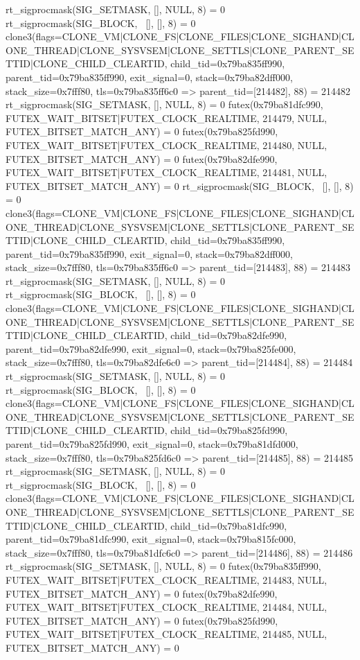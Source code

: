 \begin{breakableverbatim}
rt_sigprocmask(SIG_SETMASK, [], NULL, 8) = 0
rt_sigprocmask(SIG_BLOCK, ~[], [], 8)   = 0
clone3({flags=CLONE_VM|CLONE_FS|CLONE_FILES|CLONE_SIGHAND|CLONE_THREAD|CLONE_SYSVSEM|CLONE_SETTLS|CLONE_PARENT_SETTID|CLONE_CHILD_CLEARTID, child_tid=0x79ba835ff990, parent_tid=0x79ba835ff990, exit_signal=0, stack=0x79ba82dff000, stack_size=0x7fff80, tls=0x79ba835ff6c0} => {parent_tid=[214482]}, 88) = 214482
rt_sigprocmask(SIG_SETMASK, [], NULL, 8) = 0
futex(0x79ba81dfc990, FUTEX_WAIT_BITSET|FUTEX_CLOCK_REALTIME, 214479, NULL, FUTEX_BITSET_MATCH_ANY) = 0
futex(0x79ba825fd990, FUTEX_WAIT_BITSET|FUTEX_CLOCK_REALTIME, 214480, NULL, FUTEX_BITSET_MATCH_ANY) = 0
futex(0x79ba82dfe990, FUTEX_WAIT_BITSET|FUTEX_CLOCK_REALTIME, 214481, NULL, FUTEX_BITSET_MATCH_ANY) = 0
rt_sigprocmask(SIG_BLOCK, ~[], [], 8)   = 0
clone3({flags=CLONE_VM|CLONE_FS|CLONE_FILES|CLONE_SIGHAND|CLONE_THREAD|CLONE_SYSVSEM|CLONE_SETTLS|CLONE_PARENT_SETTID|CLONE_CHILD_CLEARTID, child_tid=0x79ba835ff990, parent_tid=0x79ba835ff990, exit_signal=0, stack=0x79ba82dff000, stack_size=0x7fff80, tls=0x79ba835ff6c0} => {parent_tid=[214483]}, 88) = 214483
rt_sigprocmask(SIG_SETMASK, [], NULL, 8) = 0
rt_sigprocmask(SIG_BLOCK, ~[], [], 8)   = 0
clone3({flags=CLONE_VM|CLONE_FS|CLONE_FILES|CLONE_SIGHAND|CLONE_THREAD|CLONE_SYSVSEM|CLONE_SETTLS|CLONE_PARENT_SETTID|CLONE_CHILD_CLEARTID, child_tid=0x79ba82dfe990, parent_tid=0x79ba82dfe990, exit_signal=0, stack=0x79ba825fe000, stack_size=0x7fff80, tls=0x79ba82dfe6c0} => {parent_tid=[214484]}, 88) = 214484
rt_sigprocmask(SIG_SETMASK, [], NULL, 8) = 0
rt_sigprocmask(SIG_BLOCK, ~[], [], 8)   = 0
clone3({flags=CLONE_VM|CLONE_FS|CLONE_FILES|CLONE_SIGHAND|CLONE_THREAD|CLONE_SYSVSEM|CLONE_SETTLS|CLONE_PARENT_SETTID|CLONE_CHILD_CLEARTID, child_tid=0x79ba825fd990, parent_tid=0x79ba825fd990, exit_signal=0, stack=0x79ba81dfd000, stack_size=0x7fff80, tls=0x79ba825fd6c0} => {parent_tid=[214485]}, 88) = 214485
rt_sigprocmask(SIG_SETMASK, [], NULL, 8) = 0
rt_sigprocmask(SIG_BLOCK, ~[], [], 8)   = 0
clone3({flags=CLONE_VM|CLONE_FS|CLONE_FILES|CLONE_SIGHAND|CLONE_THREAD|CLONE_SYSVSEM|CLONE_SETTLS|CLONE_PARENT_SETTID|CLONE_CHILD_CLEARTID, child_tid=0x79ba81dfc990, parent_tid=0x79ba81dfc990, exit_signal=0, stack=0x79ba815fc000, stack_size=0x7fff80, tls=0x79ba81dfc6c0} => {parent_tid=[214486]}, 88) = 214486
rt_sigprocmask(SIG_SETMASK, [], NULL, 8) = 0
futex(0x79ba835ff990, FUTEX_WAIT_BITSET|FUTEX_CLOCK_REALTIME, 214483, NULL, FUTEX_BITSET_MATCH_ANY) = 0
futex(0x79ba82dfe990, FUTEX_WAIT_BITSET|FUTEX_CLOCK_REALTIME, 214484, NULL, FUTEX_BITSET_MATCH_ANY) = 0
futex(0x79ba825fd990, FUTEX_WAIT_BITSET|FUTEX_CLOCK_REALTIME, 214485, NULL, FUTEX_BITSET_MATCH_ANY) = 0

\end{breakableverbatim}
